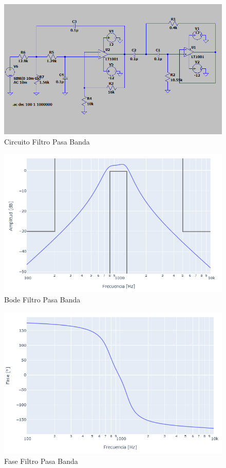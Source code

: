 \begin{figure}[H]
    \centering
    \includegraphics[width=1\linewidth]{figuras/pasabandacircuito.png}
    \caption{Circuito Filtro Pasa Banda}
\end{figure}

\begin{figure}[H]
    \centering
    \includegraphics[width=1\linewidth]{figuras/diagramas/pasa_banda_amp.png}
    \caption{Bode Filtro Pasa Banda}
\end{figure}
\begin{figure}[H]
    \centering
    \includegraphics[width=1\linewidth]{figuras/diagramas/pasa_banda_fase.png}
    \caption{Fase Filtro Pasa Banda}
\end{figure}

